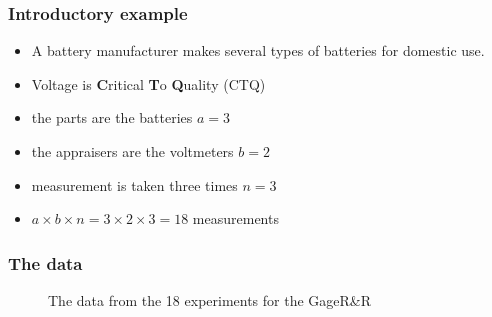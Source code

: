 \documentclass[
  a4paper,
]{scrbook}
\providecommand{\tightlist}{%
  \setlength{\itemsep}{0pt}\setlength{\parskip}{0pt}}\usepackage{longtable,booktabs,array}
\begin{document}
\subsubsection{Introductory example}\label{introductory-example}

\begin{itemize}
\tightlist
\item
  A battery manufacturer makes several types of batteries for domestic
  use.
\item
  Voltage is \textbf{C}ritical \textbf{T}o \textbf{Q}uality (CTQ)
\end{itemize}

\begin{itemize}
\tightlist
\item
  the parts are the batteries \(a = 3\)
\item
  the appraisers are the voltmeters \(b = 2\)
\item
  measurement is taken three times \(n = 3\)
\item
  \(a \times b \times n = 3 \times 2 \times 3 = 18\) measurements
\end{itemize}

\subsubsection{The data}\label{the-data}

\begin{figure}[ht]


\caption{\label{fig-msa2-data}The data from the 18 experiments for the
GageR\&R}

\end{figure}%
\end{document}
